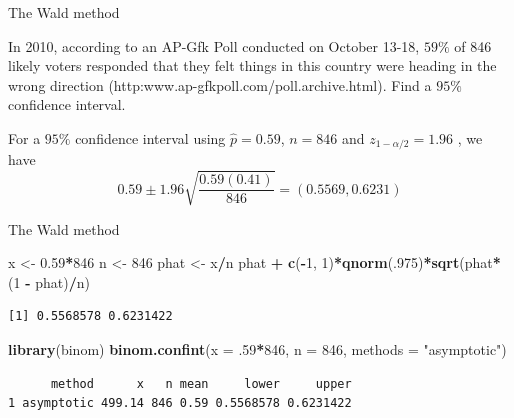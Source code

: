 \documentclass[
  ignorenonframetext,
]{beamer}
\newenvironment{Shaded}{\begin{snugshade}}{\end{snugshade}}
\newcommand{\AttributeTok}[1]{\textcolor[rgb]{0.13,0.29,0.53}{#1}}
\newcommand{\DecValTok}[1]{\textcolor[rgb]{0.00,0.00,0.81}{#1}}
\newcommand{\FloatTok}[1]{\textcolor[rgb]{0.00,0.00,0.81}{#1}}
\newcommand{\FunctionTok}[1]{\textcolor[rgb]{0.13,0.29,0.53}{\textbf{#1}}}
\newcommand{\NormalTok}[1]{#1}
\newcommand{\OtherTok}[1]{\textcolor[rgb]{0.56,0.35,0.01}{#1}}
\newcommand{\SpecialCharTok}[1]{\textcolor[rgb]{0.81,0.36,0.00}{\textbf{#1}}}
\newcommand{\StringTok}[1]{\textcolor[rgb]{0.31,0.60,0.02}{#1}}
\begin{document}
\begin{frame}{The Wald method}
\label{the-wald-method-1}
\begin{tcolorbox}
In 2010, according to an AP-Gfk Poll conducted on October 13-18, $59\%$ of 846 likely voters responded that they felt things in this country were heading in the wrong direction (http:www.ap-gfkpoll.com/poll.archive.html). Find a $95\%$ confidence interval. 
\end{tcolorbox}

\begin{tcolorbox}
For a $95\%$ confidence interval using $\hat{p}=0.59$, $n=846$ and $z_{1-\alpha/2}=1.96$ , we have
$$0.59\pm 1.96\sqrt{\frac{0.59(0.41)}{846}}=(0.5569,0.6231)$$
\end{tcolorbox}
\end{frame}

\begin{frame}[fragile]{The Wald method}
\label{the-wald-method-2}
\small

\begin{Shaded}
\begin{Highlighting}[]
\NormalTok{x }\OtherTok{\textless{}{-}} \FloatTok{0.59}\SpecialCharTok{*}\DecValTok{846}
\NormalTok{n }\OtherTok{\textless{}{-}} \DecValTok{846}
\NormalTok{phat }\OtherTok{\textless{}{-}}\NormalTok{ x}\SpecialCharTok{/}\NormalTok{n}
\NormalTok{phat }\SpecialCharTok{+} \FunctionTok{c}\NormalTok{(}\SpecialCharTok{{-}}\DecValTok{1}\NormalTok{, }\DecValTok{1}\NormalTok{)}\SpecialCharTok{*}\FunctionTok{qnorm}\NormalTok{(.}\DecValTok{975}\NormalTok{)}\SpecialCharTok{*}\FunctionTok{sqrt}\NormalTok{(phat}\SpecialCharTok{*}\NormalTok{(}\DecValTok{1} \SpecialCharTok{{-}}\NormalTok{ phat)}\SpecialCharTok{/}\NormalTok{n)}
\end{Highlighting}
\end{Shaded}

\begin{verbatim}
[1] 0.5568578 0.6231422
\end{verbatim}

\begin{Shaded}
\begin{Highlighting}[]
\FunctionTok{library}\NormalTok{(binom)}
\FunctionTok{binom.confint}\NormalTok{(}\AttributeTok{x =}\NormalTok{ .}\DecValTok{59}\SpecialCharTok{*}\DecValTok{846}\NormalTok{, }\AttributeTok{n =} \DecValTok{846}\NormalTok{, }\AttributeTok{methods =} \StringTok{"asymptotic"}\NormalTok{)}
\end{Highlighting}
\end{Shaded}

\begin{verbatim}
      method      x   n mean     lower     upper
1 asymptotic 499.14 846 0.59 0.5568578 0.6231422
\end{verbatim}

\normalsize
\end{frame}
\end{document}
